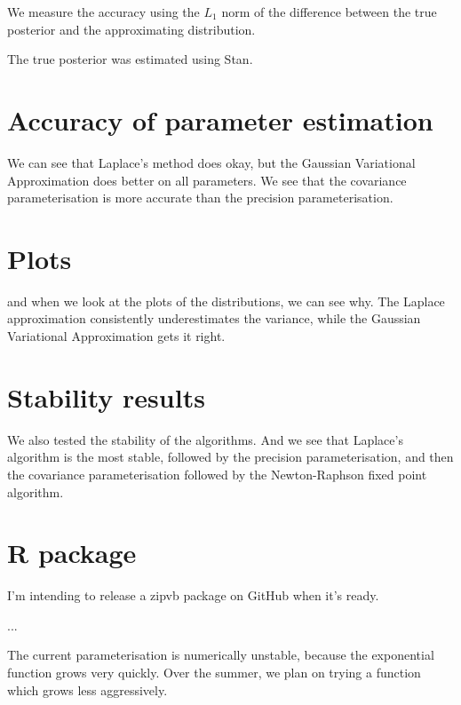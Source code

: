 \documentclass{amsart}
\begin{document}
We measure the accuracy using the $L_1$ norm of the difference between the true posterior and the approximating
distribution.

The true posterior was estimated using Stan.

\section{Accuracy of parameter estimation}

We can see that Laplace's method does okay, but the Gaussian Variational Approximation does better on all
parameters. We see that the covariance parameterisation is more accurate than the precision parameterisation.

\section{Plots}

and when we look at the plots of the distributions, we can see why. The Laplace approximation consistently
underestimates the variance, while the Gaussian Variational Approximation gets it right.

\section{Stability results}

We also tested the stability of the algorithms. And we see that Laplace's algorithm is the most stable,
followed by the precision parameterisation, and then the covariance parameterisation followed by the
Newton-Raphson fixed point algorithm.

\section{R package}

I'm intending to release a zipvb package on GitHub when it's ready.

...

The current parameterisation is numerically unstable, because the exponential function grows very quickly.
Over the summer, we plan on trying a function which grows less aggressively.
\end{document}
